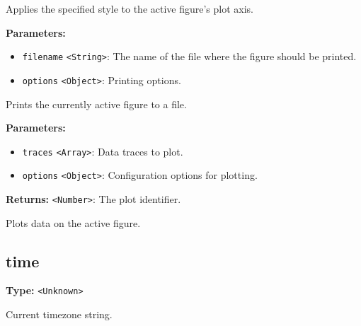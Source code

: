 \documentclass[12pt,a4paper]{article}
\begin{document}
\noindent Applies the specified style to the active figure's plot axis.

\vspace{5mm}
\noindent {}


\noindent \textbf{Parameters:}
\begin{itemize}
  \item \texttt{filename} \texttt{<String>}: The name of the file where the figure should be printed.
  \item \texttt{options} \texttt{<Object>}: Printing options.
\end{itemize}

\noindent Prints the currently active figure to a file.

\vspace{5mm}
\noindent {}


\noindent \textbf{Parameters:}
\begin{itemize}
  \item \texttt{traces} \texttt{<Array>}: Data traces to plot.
  \item \texttt{options} \texttt{<Object>}: Configuration options for plotting.
\end{itemize}

\noindent \textbf{Returns:} \texttt{<Number>}: The plot identifier.

\noindent Plots data on the active figure.


\subsection{time}
\vspace{5mm}
\noindent {}\vspace{4mm}


\noindent \textbf{Type:} \texttt{<Unknown>}

\noindent Current timezone string.

\vspace{5mm}
\noindent {}\vspace{4mm}
\end{document}
